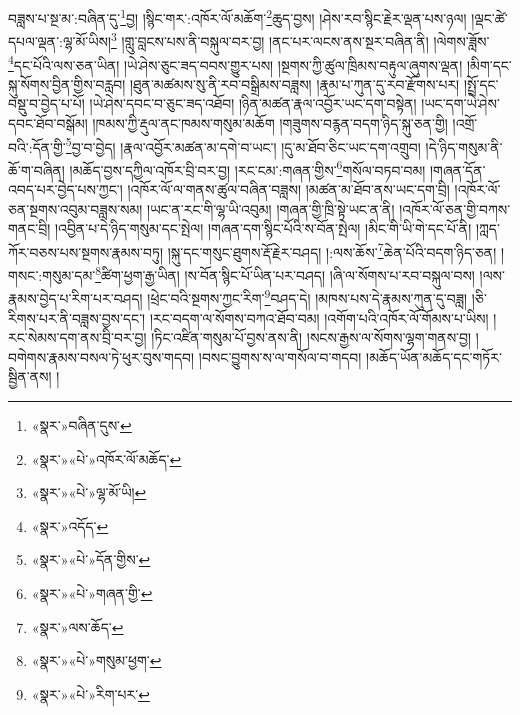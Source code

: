 བཟླས་པ་སྔ་མ་:བཞིན་དུ་\footnote{«སྣར་»བཞིན་དུས་}བྱ། །སྙིང་གར་:འཁོར་ལོ་མཆོག་\footnote{«སྣར་»«པེ་»འཁོར་ལོ་མཆོད་}ཆུད་བྱས། །ཤེས་རབ་སྙིང་རྗེར་ལྡན་པས་ཉལ། །ལྡང་ཚེ་དཔལ་ལྡན་:ལྷ་མོ་ཡིས།\footnote{«སྣར་»«པེ་»ལྷ་མོ་ཡི།} །གླུ་བླངས་པས་ནི་བསྐུལ་བར་བྱ། །ནང་པར་ལངས་ནས་སྔར་བཞིན་ནི། །ལེགས་ཟློས་\footnote{«སྣར་»འདོད་}དང་པོའི་ལས་ཅན་ཡིན། །ཡེ་ཤེས་ཅུང་ཟད་བབས་གྱུར་པས། །སྔགས་ཀྱི་ཚུལ་ཁྲིམས་བརྟུལ་ཞུགས་ལྡན། །མིག་དང་སྐུ་སོགས་བྱིན་གྱིས་བརླབ། །ཐུན་མཚམས་སུ་ནི་རབ་བསྒྲིམས་བཟླས། །རྣམ་པ་ཀུན་དུ་རབ་རྫོགས་པར། །སྤྲོ་དང་བསྡུ་བ་བྱེད་པ་པོ། །ཡེ་ཤེས་དབང་བ་ཅུང་ཟད་འཐོབ། །ཉིན་མཚན་རྣལ་འབྱོར་ཡང་དག་བསྟེན། །ཡང་དག་ཡེ་ཤེས་དབང་ཐོབ་བསྒོམ། །ཁམས་ཀྱི་རྡུལ་ནང་ཁམས་གསུམ་མཆོག །གཟུགས་བརྙན་བདག་ཉིད་སྐུ་ཅན་གྱི། །འགྲོ་བའི་:དོན་གྱི་\footnote{«སྣར་»«པེ་»དོན་གྱིས་}བྱ་བ་བྱེད། །རྣལ་འབྱོར་མཚན་མ་དགེ་བ་ཡང་། །དུ་མ་ཐོབ་ཅིང་ཡང་དག་འགྲུབ། །དེ་ཉིད་གསུམ་ནི་ཆོ་ག་བཞིན། །མཆོད་བྱས་དཀྱིལ་འཁོར་བྲི་བར་བྱ། །རང་ངམ་:གཞན་གྱིས་\footnote{«སྣར་»«པེ་»གཞན་གྱི་}གསོལ་བཏབ་བམ། །གཞན་དོན་འབད་པར་བྱེད་པས་ཀྱང་། །འཁོར་ལོ་ལ་གནས་ཚུལ་བཞིན་བཟླས། །མཚན་མ་ཐོབ་ནས་ཡང་དག་བྲི། །འཁོར་ལོ་ཅན་སྔགས་འབུམ་བཟླས་སམ། །ཡང་ན་རང་གི་ལྷ་ཡི་འབུམ། །གཞན་གྱི་ཁྲི་སྟེ་ཡང་ན་ནི། །འཁོར་ལོ་ཅན་གྱི་བཀས་གནང་བྲི། །འབྱིན་པ་དེ་ཉིད་གསུམ་དང་སྤེལ། །གཞན་དག་སྙིང་པོའི་ས་བོན་སྤེལ། །མིང་གི་ཡི་གེ་དང་པོ་ནི། །ཀླད་ཀོར་བཅས་པས་སྔགས་རྣམས་བཏུ། །སྐུ་དང་གསུང་ཐུགས་རྡོ་རྗེར་བཤད། །:ལས་ཆོས་\footnote{«སྣར་»ལས་ཆོད་}ཆེན་པོའི་བདག་ཉིད་ཅན། །གསང་:གསུམ་དམ་\footnote{«སྣར་»«པེ་»གསུམ་ཕྱག་}ཚིག་ཕྱག་རྒྱ་ཡིན། །ས་བོན་སྙིང་པོ་ཡིན་པར་བཤད། །ཞི་ལ་སོགས་པ་རབ་བསྐུལ་བས། །ལས་རྣམས་བྱེད་པ་རིག་པར་བཤད། །ཕྲེང་བའི་སྔགས་ཀྱང་རིག་\footnote{«སྣར་»«པེ་»རིག་པར་}བཤད་དེ། །མཁས་པས་དེ་རྣམས་ཀུན་དུ་བཟླ། །ཅི་རིགས་པར་ནི་བཟླས་བྱས་དང་། །རང་བདག་ལ་སོགས་བཀའ་ཐོབ་བམ། །འགོག་པའི་འཁོར་ལོ་གོམས་པ་ཡིས། །རང་སེམས་དག་ནས་བྲི་བར་བྱ། །ཏིང་འཛིན་གསུམ་པོ་བྱས་ནས་ནི། །སངས་རྒྱས་ལ་སོགས་ལྷག་གནས་བྱ། །བགེགས་རྣམས་བསལ་ཏེ་ཕུར་བུས་གདབ། །བསང་བྱུགས་ས་ལ་གསོལ་བ་གདབ། །མཆོད་ཡོན་མཆོད་དང་གཏོར་སྦྱིན་ནས། །
